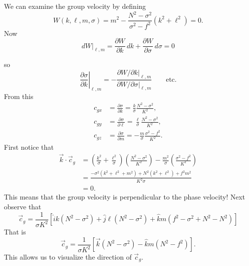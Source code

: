 We can examine the group velocity by defining
\[
	W(k,\ell,m,\sigma)
	=m^2-\frac{N^2-\sigma^2}{\sigma^2-f^2}(k^2+\ell^2)=0.
\]
Now
\[
	dW\big|_{\ell,m}
	=\frac{\partial W}{\partial k}\,dk
	+\frac{\partial W}{\partial\sigma}\,d\sigma=0
\]

\sourcepagebreak

so
\[
	\left.\frac{\partial\sigma}{\partial k}\right|_{\ell,m}
	=-\frac{\left.\partial W/\partial k\right|_{\ell,m}}
	{\left.\partial W/\partial\sigma\right|_{\ell,m}}
	\qquad\text{etc.}
\]
From this
\begin{align*}
	c_{gx} & =\frac{\partial\sigma}{\partial k}
	=\frac{k}{\sigma}\frac{N^2-\sigma^2}{K^2},    \\
	c_{gy} & =\frac{\partial\sigma}{\partial\ell}
	=\frac{\ell}{\sigma}\frac{N^2-\sigma^2}{K^2}, \\
	c_{gz} & =\frac{\partial\sigma}{\partial m}
	=-\frac{m}{\sigma}\frac{\sigma^2-f^2}{K^2}.
\end{align*}
First notice that
\begin{align*}
	\vec k\cdot\vec c_g
	 & =\left(\frac{k^2}{\sigma}+\frac{\ell^2}{\sigma}\right)
	\left(\frac{N^2-\sigma^2}{K^2}\right)
	-\frac{m^2}{\sigma}\left(\frac{\sigma^2-f^2}{K^2}\right)               \\
	 & =\frac{-\sigma^2(k^2+\ell^2+m^2)+N^2(k^2+\ell^2)+f^2m^2}{K^2\sigma} \\
	 & =0.
\end{align*}
This means that the group velocity is perpendicular to the phase velocity! Next
observe that
\[
	\vec c_g=\frac{1}{\sigma K^2}
	[\hat i k(N^2-\sigma^2)+\hat j\ell(N^2-\sigma^2)
		+\hat k m(f^2-\sigma^2+N^2-N^2)]
\]
That is
\[
	\vec c_g=\frac{1}{\sigma K^2}
	[\vec k(N^2-\sigma^2)-\hat k m(N^2-f^2)].
\]
This allows us to visualize the direction of $\vec c_g$.

\sourcepagebreak


